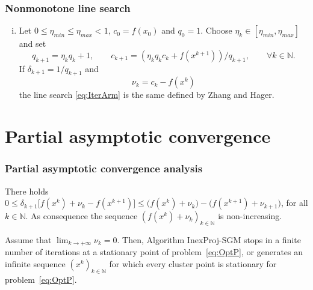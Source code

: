 \begin{frame}[t]\frametitle{Nonmonotone line search}
  \begin{block}{}
    \begin{enumerate}[(iii)]
      \item Let   $0\leq \eta_{min}\leq \eta_{max}<1$,   $c_0 = f(x_0)$ and  $q_0 = 1$. Choose $\eta_k\in [\eta_{min},  \eta_{max}]$ and set
            \begin{equation*}
              q_{k+1}=\eta_kq_{k}+1, \qquad c_{k+1} = (\eta_k q_k c_k + f(x^{k+1}))/q_{k+1}, \qquad \forall k \in \mathbb{N}.
            \end{equation*}
            If $\delta_{k+1}=1/q_{k+1}$ and
            \begin{equation}\label{eq:nuZH}
              \nu_{k}=c_k-f(x^k)
            \end{equation}
            the line search \eqref{eq:IterArm} is the same defined by Zhang and Hager.
    \end{enumerate}
  \end{block}
\end{frame}



\section{Partial asymptotic convergence}


\begin{frame}[t]\frametitle{Partial asymptotic convergence analysis}
  \begin{lemma}
    There holds  $0\leq \delta_{k+1}\Big[ f(x^{k})+\nu_{k}-  f(x^{k+1})\Big] \leq \Big( f(x^{k})+\nu_{k}\Big) - \Big( f(x^{k+1})+\nu_{k+1}\Big)$, for all $k \in \mathbb{N}$. As consequence the sequence   $\left(f(x^k)+\nu_k\right)_{k\in\mathbb{N}}$ is    non-increasing.
  \end{lemma}

  \bigskip
  \bigskip



  \begin{theorem} 
    Assume that $\displaystyle\lim_{k\to +\infty} \nu_{k} = 0$.   Then, Algorithm InexProj-SGM stops in a finite number of iterations at a stationary point of problem~\eqref{eq:OptP}, or generates an infinite sequence $(x^k)_{k\in\mathbb{N}}$ for which every cluster point is stationary for problem~\eqref{eq:OptP}.
  \end{theorem}
\end{frame}



